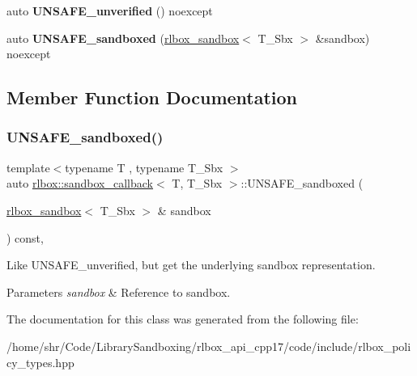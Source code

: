\begin{DoxyCompactItemize}
\mbox{\label{classrlbox_1_1sandbox__callback_a8a9a501dd7e47030fabf84491303354f}} 
auto {\bfseries U\+N\+S\+A\+F\+E\+\_\+unverified} () noexcept
\item 
\mbox{\label{classrlbox_1_1sandbox__callback_a12f4b98341c36fa3eb97d9da82443bc8}} 
auto {\bfseries U\+N\+S\+A\+F\+E\+\_\+sandboxed} (\hyperlink{classrlbox_1_1rlbox__sandbox}{rlbox\+\_\+sandbox}$<$ T\+\_\+\+Sbx $>$ \&sandbox) noexcept
\end{DoxyCompactItemize}


\subsection{Member Function Documentation}
\mbox{\label{classrlbox_1_1sandbox__callback_a0a71e99d85bd22cd642327017c863b26}} 
\subsubsection{\texorpdfstring{U\+N\+S\+A\+F\+E\+\_\+sandboxed()}{UNSAFE\_sandboxed()}}
{\footnotesize\ttfamily template$<$typename T , typename T\+\_\+\+Sbx $>$ \\
auto \hyperlink{classrlbox_1_1sandbox__callback}{rlbox\+::sandbox\+\_\+callback}$<$ T, T\+\_\+\+Sbx $>$\+::U\+N\+S\+A\+F\+E\+\_\+sandboxed (\begin{DoxyParamCaption}\item[{\hyperlink{classrlbox_1_1rlbox__sandbox}{rlbox\+\_\+sandbox}$<$ T\+\_\+\+Sbx $>$ \&}]{sandbox }\end{DoxyParamCaption}) const\hspace{0.3cm}{\ttfamily [inline]}, {\ttfamily [noexcept]}}



Like U\+N\+S\+A\+F\+E\+\_\+unverified, but get the underlying sandbox representation. 


\begin{DoxyParams}{Parameters}
{\em sandbox} & Reference to sandbox. \\
\hline
\end{DoxyParams}


The documentation for this class was generated from the following file\+:\begin{DoxyCompactItemize}
\item 
/home/shr/\+Code/\+Library\+Sandboxing/rlbox\+\_\+api\+\_\+cpp17/code/include/rlbox\+\_\+policy\+\_\+types.\+hpp\end{DoxyCompactItemize}
